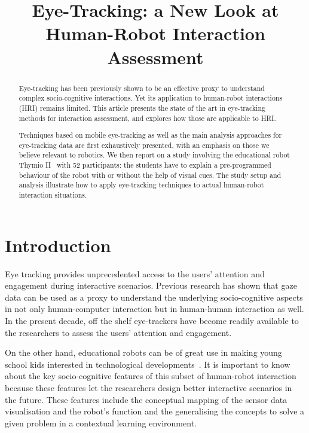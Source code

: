\documentclass{sig-alternate}
\title{\LARGE \bf
    Eye-Tracking: a New Look at Human-Robot Interaction Assessment
}
\begin{document}
\maketitle
\begin{abstract}


Eye-tracking has been previously shown to be an effective proxy to understand
complex socio-cognitive interactions. Yet its application to human-robot
interactions (HRI) remains limited. This article presents the state of the
art in eye-tracking methods for interaction assessment, and explores how those
are applicable to HRI.

Techniques based on mobile eye-tracking as well as the main analysis approaches
for eye-tracking data are first exhaustively presented, with an emphasis on
those we believe relevant to robotics. We then report on a study involving the
educational robot Thymio II~\cite{riedo2012two} with 52 participants: the
students have to explain a pre-programmed behaviour of the robot with or without
the help of visual cues. The study setup and analysis illustrate how to apply
eye-tracking techniques to actual human-robot interaction situations.

\end{abstract}
\section{Introduction}

Eye tracking provides unprecedented access to the users' attention and
engagement during interactive scenarios. Previous research has shown
that gaze data can be used as a proxy to understand the underlying
socio-cognitive aspects in not only human-computer interaction but in
human-human interaction as well. In the present decade, off the shelf
eye-trackers have become readily available to the researchers to assess
the users' attention and engagement.

On the other hand, educational robots can be of great use in making young school
kids interested in technological developments~\cite{cooper1999robots,
wyffels2010building}. It is important to know about the key socio-cognitive
features of this subset of human-robot interaction because these features let
the researchers design better interactive scenarios in the future. These
features include the conceptual mapping of the sensor data visualisation and the
robot's function and the generalising the concepts to solve a given problem in a
contextual learning environment.
\end{document}

